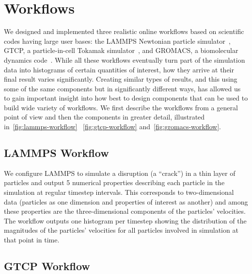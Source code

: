 \section{Workflows}
\label{s:workflows}

We designed and implemented three realistic online workflows based on
scientific codes having large user bases: the LAMMPS Newtonian particle
simulator~\cite{plimpton:1997:lammps}, GTCP, a particle-in-cell Tokamak
simulator~\cite{lin:gtc}, and GROMACS,
a biomolecular dynamics code~\cite{hess2008gromacs}.
While all these workflows eventually turn part of the
simulation data into histograms of certain quantities of interest, how they
arrive at their final result varies significantly.
Creating similar types of results, and this using some
of the same components but in significantly
different ways, has allowed us to gain important insight into how best to
design components that can be used to build wide variety of workflows.
We first describe the workflows from a general point of view
and then the components in greater detail, illustrated
in~\autoref{fig:lammps-workflow} ~\autoref{fig:gtcp-workflow}
and~\autoref{fig:gromacs-workflow}.

\subsection{LAMMPS Workflow}

We configure LAMMPS to simulate a disruption (a ``crack'') in a thin layer of
particles and output 5 numerical properties describing each particle in the
simulation at regular timestep intervals. This corresponds to two-dimensional
data (particles as one dimension and properties of interest as another) and
among these properties are the three-dimensional components of the particles'
velocities. The workflow outputs one histogram per timestep
showing the distribution of the magnitudes of the particles' velocities
for all particles involved in simulation at that point in
time.

\subsection{GTCP Workflow}

